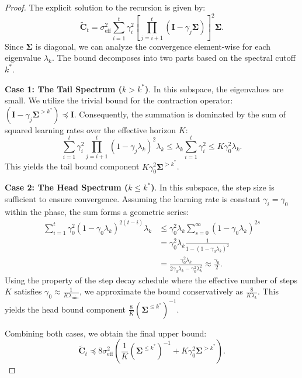 \documentclass{article}
\theoremstyle{definition}
\theoremstyle{definition}
\theoremstyle{plain}
\theoremstyle{plain}
\theoremstyle{plain}
\theoremstyle{plain}
\theoremstyle{plain}
\newcommand{\bs}[1]{\boldsymbol{\mathbf{#1}}}
\newcommand{\eff}{\mathrm{eff}}
\newcommand{\id}{\mathbf{I}}
\begin{document}
\begin{proof}
    The explicit solution to the recursion is given by:
    \begin{equation}
        \tilde{\bs C}_t = \sigma_\eff^2 \sum_{i = 1}^t \gamma_i^2 \left[ \prod_{j=i+1}^t(\id-\gamma_j\bs\Sigma) \right]^2 \bs \Sigma.
    \end{equation}
    Since $\bs \Sigma$ is diagonal, we can analyze the convergence element-wise for each eigenvalue $\lambda_k$. The bound decomposes into two parts based on the spectral cutoff $k^*$.

    \textbf{Case 1: The Tail Spectrum ($k > k^*$)}.
    In this subspace, the eigenvalues are small. We utilize the trivial bound for the contraction operator: $(\id - \gamma_j \bs \Sigma^{>k^*}) \preceq \id$. Consequently, the summation is dominated by the sum of squared learning rates over the effective horizon $K$:
    \begin{equation}
        \sum_{i=1}^t \gamma_i^2 \prod_{j=i+1}^t (1-\gamma_j \lambda_k)^2 \lambda_k \leq \lambda_k \sum_{i=1}^t \gamma_i^2 \leq K \gamma_0^2 \lambda_k.
    \end{equation}
    This yields the tail bound component $K\gamma_0^2 \bs\Sigma^{>k^*}$.

    \textbf{Case 2: The Head Spectrum ($k \leq k^*$)}.
    In this subspace, the step size is sufficient to ensure convergence. Assuming the learning rate is constant $\gamma_i = \gamma_0$ within the phase, the sum forms a geometric series:
    \begin{equation}
    \begin{aligned}
        \sum_{i=1}^t \gamma_0^2 (1-\gamma_0 \lambda_k)^{2(t-i)} \lambda_k & \leq \gamma_0^2 \lambda_k \sum_{s=0}^\infty (1-\gamma_0 \lambda_k)^{2s} \\
        &= \gamma_0^2 \lambda_k \frac{1}{1 - (1-\gamma_0 \lambda_k)^2} \\
        &= \frac{\gamma_0^2 \lambda_k}{2\gamma_0 \lambda_k - \gamma_0^2 \lambda_k^2} \approx \frac{\gamma_0}{2}.
    \end{aligned}
    \end{equation}
    Using the property of the step decay schedule where the effective number of steps $K$ satisfies $\gamma_0 \approx \frac{1}{K \lambda_{\min}}$, we approximate the bound conservatively as $\frac{8}{K \lambda_k}$. This yields the head bound component $\frac{8}{K}(\bs\Sigma^{\leq k^*})^{-1}$.

    Combining both cases, we obtain the final upper bound:
    \begin{equation}
        \tilde{\bs C}_t \preceq 8\sigma_\eff^2 \left( \frac{1}{K}(\bs\Sigma^{\leq k^*})^{-1} + K\gamma_0^2 \bs\Sigma^{>k^*} \right).
    \end{equation}
\end{proof}
\end{document}
